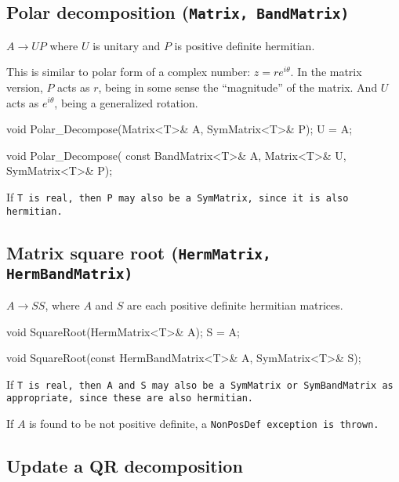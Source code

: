 \subsection[Polar decomposition] {Polar decomposition \rm (\tt{Matrix}, \tt{BandMatrix})}

$A \rightarrow U P$ where $U$ is unitary and $P$ is positive definite hermitian.

This is similar to polar form of a complex number: $z = r e^{i \theta}$.
In the matrix version, $P$ acts as $r$, being in some sense the ``magnitude'' 
of the matrix.  And $U$ acts as $e^{i \theta}$, being a generalized rotation.

\begin{tmvcode}
void Polar_Decompose(Matrix<T>& A, SymMatrix<T>& P);
U = A;

void Polar_Decompose(
      const BandMatrix<T>& A, Matrix<T>& U, SymMatrix<T>& P);
\end{tmvcode}
If \tt{T} is real, then \tt{P} may also be a \tt{SymMatrix}, since it is also hermitian.

\subsection[Matrix square root] {Matrix square root \rm (\tt{HermMatrix}, \tt{HermBandMatrix})}

$A \rightarrow S S$, where $A$ and $S$ are each positive definite hermitian matrices.

\begin{tmvcode}
void SquareRoot(HermMatrix<T>& A);
S = A;

void SquareRoot(const HermBandMatrix<T>& A, SymMatrix<T>& S);
\end{tmvcode}
If \tt{T} is real, then \tt{A} and \tt{S} may also be a \tt{SymMatrix} or \tt{SymBandMatrix} as appropriate, since these are also hermitian.

If $A$ is found to be not positive definite, a \tt{NonPosDef} exception is thrown.

\subsection{Update a QR decomposition}
\label{QRUpdate}

